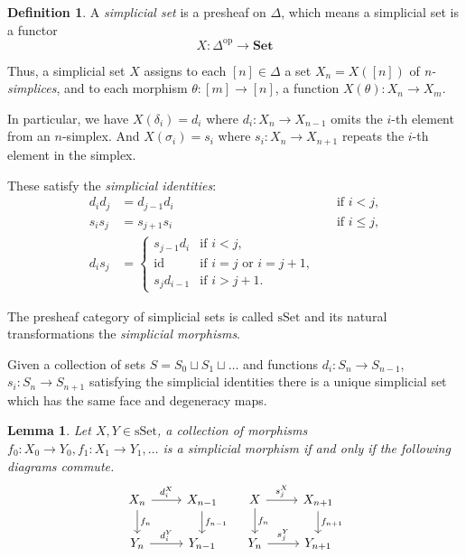 \documentclass[12pt]{article}
\newtheorem{lemma}[theorem]{Lemma}
\theoremstyle{definition}
\newtheorem{definition}[theorem]{Definition}
\newcommand{\1}{\mathbbm{1}}
\newcommand{\Set}{\mathbf{Set}}
\begin{document}
\begin{definition}
    A \emph{simplicial set} is a presheaf on \( \Delta \), which means a simplicial set is a functor
    \[
    X \colon \Delta^{\mathrm{op}} \to \Set
    \]
    
    Thus, a simplicial set \( X \) assigns to each \( [n] \in \Delta \) a set \( X_n = X([n]) \) of \emph{n-simplices}, and to each morphism \( \theta \colon [m] \to [n] \), a function \( X(\theta) \colon X_n \to X_m \).
    
    In particular, we have $X(\delta_i) = d_i$ where $d_i: X_n\to X_{n-1}$ omits the $i$-th element from an $n$-simplex. And $X(\sigma_i) = s_i$ where $s_i: X_n \to X_{n+1}$ repeats the $i$-th element in the simplex.
    
    These satisfy the \emph{simplicial identities}:
    \[
    \begin{aligned}
    d_i d_j &= d_{j-1} d_i && \text{if } i < j, \\
    s_i s_j &= s_{j+1} s_i && \text{if } i \leq j, \\
    d_i s_j &=
    \begin{cases}
    s_{j-1} d_i & \text{if } i < j, \\
    \mathrm{id} & \text{if } i = j \text{ or } i = j+1, \\
    s_j d_{i-1} & \text{if } i > j+1.
    \end{cases}
    \end{aligned}
    \]

    The presheaf category of simplicial sets is called $\mathrm{sSet}$ and its natural transformations the \emph{simplicial morphisms}.
    
    Given a collection of sets $S = S_0 \sqcup S_1 \sqcup \dots$ and functions $d_i: S_n\to S_{n-1}$, $s_i: S_n \to S_{n+1}$ satisfying the simplicial identities there is a unique simplicial set which has the same face and degeneracy maps.
\end{definition}

\begin{lemma}
    Let $X, Y\in \mathrm{sSet}$, a collection of morphisms $f_0: X_0\to Y_0, f_1: X_1\to Y_1, \dots$ is a simplicial morphism if and only if the following diagrams commute.
    \[
        \begin{tikzcd}
        X_n \arrow{r}{d_i^X} \arrow{d}{f_n} & X_{n-1} \arrow{d}{f_{n-1}} \\
        Y_n \arrow{r}{d_i^Y} & Y_{n-1}
        \end{tikzcd}
        \quad
        \begin{tikzcd}
        X \arrow{r}{s_j^X} \arrow{d}{f_n} & X_{n+1} \arrow{d}{f_{n+1}} \\
        Y_n \arrow{r}{s_j^Y} & Y_{n+1}
        \end{tikzcd}
    \]
\end{lemma}
\end{document}
